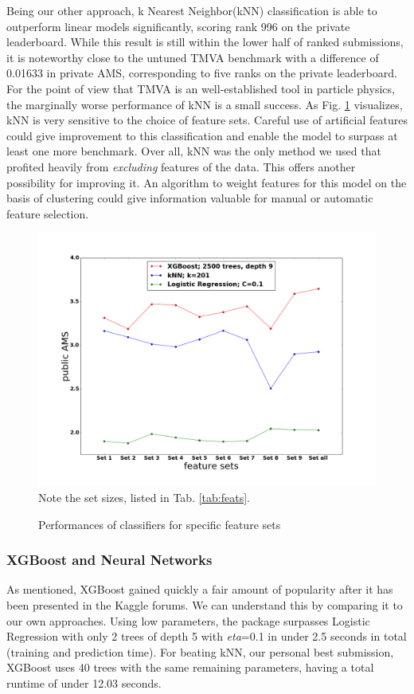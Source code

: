 Being our other approach, k Nearest Neighbor(kNN) classification is able to outperform linear models significantly, scoring rank 996 on the private leaderboard. While this result is still within the lower half of ranked submissions, it is noteworthy close to the untuned TMVA benchmark with a difference of 0.01633 in private AMS, corresponding to five ranks on the private leaderboard. For the point of view that TMVA is an well-established tool in particle physics, the marginally worse performance of kNN is a small success.
As Fig. \ref{fig:setperf} visualizes, kNN is very sensitive to the choice of feature sets. Careful use of artificial features could give improvement to this classification and enable the model to surpass at least one more benchmark.
Over all, kNN was the only method we used that profited heavily from \emph{excluding} features of the data. This offers another possibility for improving it. An algorithm to weight features for this model on the basis of clustering could give information valuable for manual or automatic feature selection.

\begin{figure}[h]
	\centering
	\includegraphics[width=\textwidth]{images/setperformance}
	\\Note the set sizes, listed in Tab. \ref{tab:feats}.
	\caption{Performances of classifiers for specific feature sets}
	\label{fig:setperf}
\end{figure}

\subsubsection{XGBoost and Neural Networks}
As mentioned, XGBoost gained quickly a fair amount of popularity after it has been presented in the Kaggle forums. We can understand this by comparing it to our own approaches.
Using low parameters, the package surpasses Logistic Regression with only 2 trees of depth 5 with \emph{eta}=0.1 in under 2.5 seconds in total (training and prediction time). For beating kNN, our personal best submission, XGBoost uses 40 trees with the same remaining parameters, having a total runtime of under 12.03 seconds.

